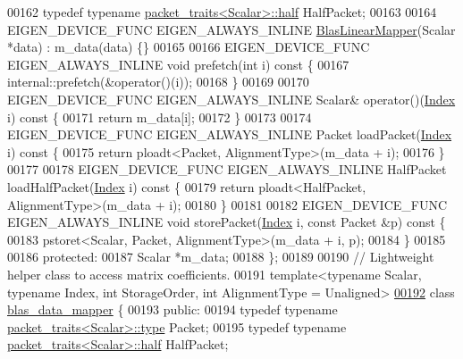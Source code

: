 \begin{DoxyCode}
00162   \textcolor{keyword}{typedef} \textcolor{keyword}{typename} \hyperlink{struct_eigen_1_1internal_1_1packet__traits}{packet\_traits<Scalar>::half} HalfPacket;
00163 
00164   EIGEN\_DEVICE\_FUNC EIGEN\_ALWAYS\_INLINE \hyperlink{class_eigen_1_1internal_1_1_blas_linear_mapper}{BlasLinearMapper}(Scalar *data) : m\_data(data) \{\}
00165 
00166   EIGEN\_DEVICE\_FUNC EIGEN\_ALWAYS\_INLINE \textcolor{keywordtype}{void} prefetch(\textcolor{keywordtype}{int} i)\textcolor{keyword}{ const }\{
00167     internal::prefetch(&\textcolor{keyword}{operator}()(i));
00168   \}
00169 
00170   EIGEN\_DEVICE\_FUNC EIGEN\_ALWAYS\_INLINE Scalar& operator()(\hyperlink{namespace_eigen_a62e77e0933482dafde8fe197d9a2cfde}{Index} i)\textcolor{keyword}{ const }\{
00171     \textcolor{keywordflow}{return} m\_data[i];
00172   \}
00173 
00174   EIGEN\_DEVICE\_FUNC EIGEN\_ALWAYS\_INLINE Packet loadPacket(\hyperlink{namespace_eigen_a62e77e0933482dafde8fe197d9a2cfde}{Index} i)\textcolor{keyword}{ const }\{
00175     \textcolor{keywordflow}{return} ploadt<Packet, AlignmentType>(m\_data + i);
00176   \}
00177 
00178   EIGEN\_DEVICE\_FUNC EIGEN\_ALWAYS\_INLINE HalfPacket loadHalfPacket(\hyperlink{namespace_eigen_a62e77e0933482dafde8fe197d9a2cfde}{Index} i)\textcolor{keyword}{ const }\{
00179     \textcolor{keywordflow}{return} ploadt<HalfPacket, AlignmentType>(m\_data + i);
00180   \}
00181 
00182   EIGEN\_DEVICE\_FUNC EIGEN\_ALWAYS\_INLINE \textcolor{keywordtype}{void} storePacket(\hyperlink{namespace_eigen_a62e77e0933482dafde8fe197d9a2cfde}{Index} i, \textcolor{keyword}{const} Packet &p)\textcolor{keyword}{ const }\{
00183     pstoret<Scalar, Packet, AlignmentType>(m\_data + i, p);
00184   \}
00185 
00186   \textcolor{keyword}{protected}:
00187   Scalar *m\_data;
00188 \};
00189 
00190 \textcolor{comment}{// Lightweight helper class to access matrix coefficients.}
00191 \textcolor{keyword}{template}<\textcolor{keyword}{typename} Scalar, \textcolor{keyword}{typename} Index, \textcolor{keywordtype}{int} StorageOrder, \textcolor{keywordtype}{int} AlignmentType = Unaligned>
\hyperlink{class_eigen_1_1internal_1_1blas__data__mapper}{00192} \textcolor{keyword}{class }\hyperlink{class_eigen_1_1internal_1_1blas__data__mapper}{blas\_data\_mapper} \{
00193   \textcolor{keyword}{public}:
00194   \textcolor{keyword}{typedef} \textcolor{keyword}{typename} \hyperlink{struct_eigen_1_1internal_1_1packet__traits}{packet\_traits<Scalar>::type} Packet;
00195   \textcolor{keyword}{typedef} \textcolor{keyword}{typename} \hyperlink{struct_eigen_1_1internal_1_1packet__traits}{packet\_traits<Scalar>::half} HalfPacket;

\end{DoxyCode}
